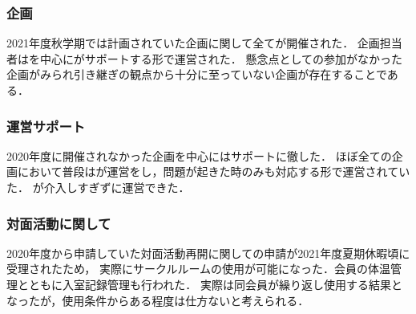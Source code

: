 \subsubsection*{企画}
2021年度秋学期では計画されていた企画に関して全てが開催された．
企画担当者は\secondGrade{}を中心に\thirdGrade{}がサポートする形で運営された．
懸念点として\firstGrade{}の参加がなかった企画がみられ引き継ぎの観点から十分に至っていない企画が存在することである．

\subsubsection*{運営サポート}
2020年度に開催されなかった企画を中心に\thirdGrade{}はサポートに徹した．
ほぼ全ての企画において普段は\secondGrade{}が運営をし，問題が起きた時のみ\thirdGrade{}も対応する形で運営されていた．
\thirdGrade{}が介入しすぎずに運営できた．

\subsubsection*{対面活動に関して}
2020年度から申請していた対面活動再開に関しての申請が2021年度夏期休暇頃に受理されたため，
実際にサークルルームの使用が可能になった．会員の体温管理とともに入室記録管理も行われた．
実際は同会員が繰り返し使用する結果となったが，使用条件からある程度は仕方ないと考えられる．
